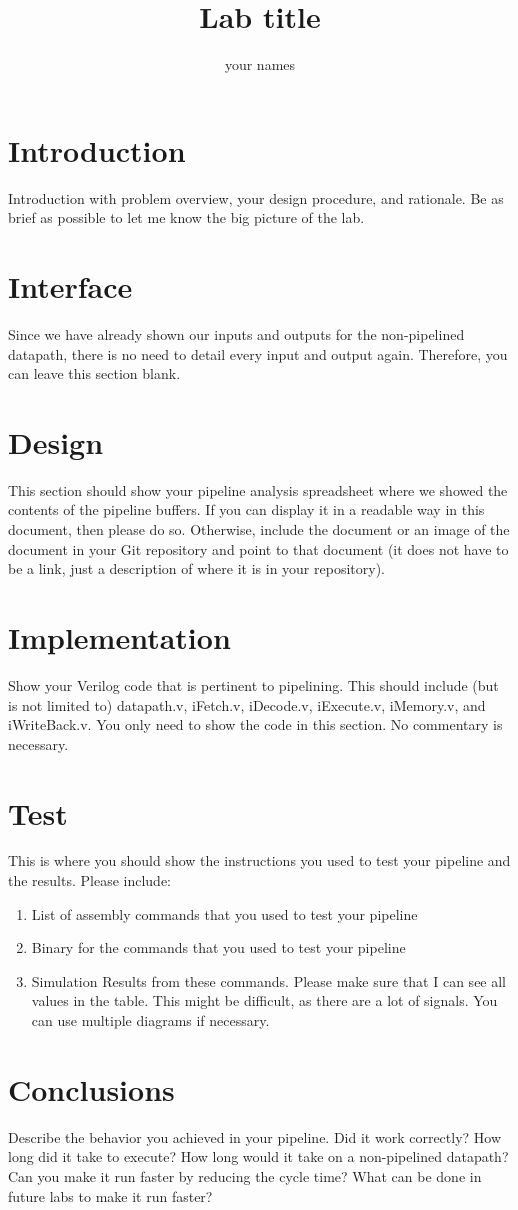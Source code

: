 \documentclass{article}
\author{your names}
\title{Lab title}
\begin{document}
\maketitle

\section{Introduction}
Introduction with problem overview, your design procedure, and rationale.  Be as brief as possible to let me know the big picture of the lab.

\section{Interface}
Since we have already shown our inputs and outputs for the non-pipelined datapath, there is no need to detail every input and output again.  Therefore, you can leave this section blank.  

\section{Design}
This section should show your pipeline analysis spreadsheet where we showed the contents of the pipeline buffers.  If you can display it in a readable way in this document, then please do so.  Otherwise, include the document or an image of the document in your Git repository and point to that document (it does not have to be a link, just a description of where it is in your repository).

\section{Implementation}
Show your Verilog code that is pertinent to pipelining.  This should include (but is not limited to) datapath.v, iFetch.v, iDecode.v, iExecute.v, iMemory.v, and iWriteBack.v.  You only need to show the code in this section.  No commentary is necessary. 

\section{Test}
This is where you should show the instructions you used to test your pipeline and the results.  Please include:
\begin{enumerate}
	\item List of assembly commands that you used to test your pipeline
	\item Binary for the commands that you used to test your pipeline
	\item Simulation Results from these commands.  Please make sure that I can see all values in the table.  This might be difficult, as there are a lot of signals.  You can use multiple diagrams if necessary.  
\end{enumerate}

\section{Conclusions}
Describe the behavior you achieved in your pipeline.  Did it work correctly?  How long did it take to execute?  How long would it take on a non-pipelined datapath?  Can you make it run faster by reducing the cycle time?  What can be done in future labs to make it run faster?
\end{document}
